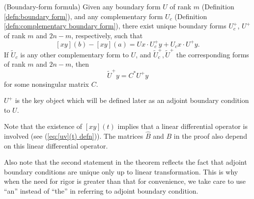 \documentclass[11pt, oneside, a4paper]{article}
\begin{document}
\begin{thm}\cite[p.288]{CoddingtonLevinson}{(Boundary-form formula)}\label{thm:boundary form formula}
    Given any boundary form $U$ of rank $m$ (Definition \ref{defn:boundary form}), and any complementary form $U_c$ (Definition \ref{defn:complementary boundary form}), there exist unique boundary forms $U_c^+$, $U^+$ of rank $m$ and $2n-m$, respectively, such that
    \begin{equation}\label{eq:boundary form formula}
        [xy](b)-[xy](a) = Ux\cdot U_c^+y + U_{c}x\cdot U^+y.
    \end{equation}
    If $\tilde{U}_c$ is any other complementary form to $U$, and $\tilde{U}^+_c, \tilde{U}^+$ the corresponding forms of rank $m$ and $2n-m$, then
    \begin{equation}\label{eq:adjoint boundary forms unique only up to linear transformation}
        \tilde{U}^+ y = C^*U^+y
    \end{equation}
    for some nonsingular matrix $C$.
\end{thm}
\begin{rmk}
    $U^+$ is the key object which will be defined later as an adjoint boundary condition to $U$.

    Note that the existence of $[xy](t)$ implies that a linear differential operator is involved (see (\ref{eq:[uv](t) defn})). The matrices $\hat{B}$ and $B$ in the proof also depend on this linear differential operator.

    Also note that the second statement in the theorem reflects the fact that adjoint boundary conditions are unique only up to linear transformation. This is why when the need for rigor is greater than that for convenience, we take care to use ``an'' instead of ``the'' in referring to adjoint boundary condition.
\end{rmk}
\end{document}
